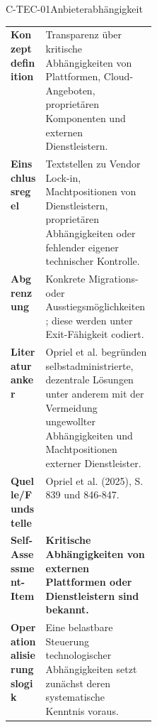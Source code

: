 \documentclass[10pt,a4paper]{article}
\begin{document}
\begin{codecard}{C-TEC-01}{Anbieterabhängigkeit}
\begin{tabularx}{\linewidth}{@{}>{\RaggedRight\arraybackslash\bfseries\color{DeepNavy}}p{0.245\linewidth}>{\RaggedRight\arraybackslash}X@{}}
Konzeptdefinition & Transparenz über kritische Abhängigkeiten von Plattformen, Cloud-Angeboten, proprietären Komponenten und externen Dienstleistern. \\
\arrayrulecolor{SoftRule}\hline
Einschlussregel & Textstellen zu Vendor Lock-in, Machtpositionen von Dienstleistern, proprietären Abhängigkeiten oder fehlender eigener technischer Kontrolle. \\
\arrayrulecolor{SoftRule}\hline
Abgrenzung & Konkrete Migrations- oder Ausstiegsmöglichkeiten; diese werden unter Exit-Fähigkeit codiert. \\
\arrayrulecolor{SoftRule}\hline
Literaturanker & Opriel et al. begründen selbstadministrierte, dezentrale Lösungen unter anderem mit der Vermeidung ungewollter Abhängigkeiten und Machtpositionen externer Dienstleister. \\
\arrayrulecolor{SoftRule}\hline
Quelle/Fundstelle & Opriel et al. (2025), S. 839 und 846-847. \\
\arrayrulecolor{SoftRule}\hline
Self-Assessment-Item & \textbf{Kritische Abhängigkeiten von externen Plattformen oder Dienstleistern sind bekannt.} \\
\arrayrulecolor{SoftRule}\hline
Operationalisierungslogik & Eine belastbare Steuerung technologischer Abhängigkeiten setzt zunächst deren systematische Kenntnis voraus. \\
\end{tabularx}
\end{codecard}
\end{document}
